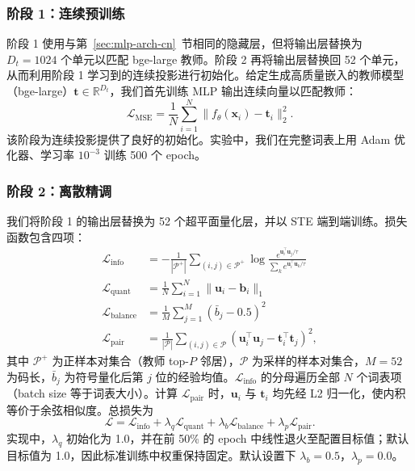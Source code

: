 \documentclass[11pt,a4paper]{article}
\begin{document}
\subsubsection{阶段 1：连续预训练}\label{sec:stage1-cn}

阶段 1 使用与第~\ref{sec:mlp-arch-cn}~节相同的隐藏层，但将输出层替换为 $D_t=1024$ 个单元以匹配 bge-large 教师。阶段 2 再将输出层替换回 52 个单元，从而利用阶段 1 学习到的连续投影进行初始化。给定生成高质量嵌入的教师模型（bge-large）$\mathbf{t} \in \mathbb{R}^{D_t}$，我们首先训练 MLP 输出连续向量以匹配教师：
\begin{equation}
    \mathcal{L}_{\text{MSE}} = \frac{1}{N} \sum_{i=1}^{N} \| f_\theta(\mathbf{x}_i) - \mathbf{t}_i \|_2^2.
\end{equation}
该阶段为连续投影提供了良好的初始化。实验中，我们在完整词表上用 Adam 优化器、学习率 $10^{-3}$ 训练 500 个 epoch。

\subsubsection{阶段 2：离散精调}\label{sec:stage2-cn}

我们将阶段 1 的输出层替换为 52 个超平面量化层，并以 STE 端到端训练。损失函数包含四项：
\begin{align}
    \mathcal{L}_{\text{info}} &= -\frac{1}{|\mathcal{P}^+|}\sum_{(i,j) \in \mathcal{P}^+} \log \frac{e^{\mathbf{u}_i^\top \mathbf{u}_j / \tau}}{\sum_{k} e^{\mathbf{u}_i^\top \mathbf{u}_k / \tau}} \\
    \mathcal{L}_{\text{quant}} &= \frac{1}{N} \sum_{i=1}^{N} \| \mathbf{u}_i - \mathbf{b}_i \|_1 \\
    \mathcal{L}_{\text{balance}} &= \frac{1}{M} \sum_{j=1}^{M} \left( \bar{b}_j - 0.5 \right)^2 \\
    \mathcal{L}_{\text{pair}} &= \frac{1}{|\mathcal{P}|} \sum_{(i,j) \in \mathcal{P}} \left( \mathbf{u}_i^\top \mathbf{u}_j - \mathbf{t}_i^\top \mathbf{t}_j \right)^2,
\end{align}
其中 $\mathcal{P}^+$ 为正样本对集合（教师 top-$P$ 邻居），$\mathcal{P}$ 为采样的样本对集合，$M=52$ 为码长，$\bar{b}_j$ 为符号量化后第 $j$ 位的经验均值。$\mathcal{L}_{\text{info}}$ 的分母遍历全部 $N$ 个词表项（batch size 等于词表大小）。计算 $\mathcal{L}_{\text{pair}}$ 时，$\mathbf{u}_i$ 与 $\mathbf{t}_i$ 均先经 L2 归一化，使内积等价于余弦相似度。总损失为
\begin{equation}
    \mathcal{L} = \mathcal{L}_{\text{info}} + \lambda_q \mathcal{L}_{\text{quant}} + \lambda_b \mathcal{L}_{\text{balance}} + \lambda_p \mathcal{L}_{\text{pair}}.
\end{equation}
实现中，$\lambda_q$ 初始化为 1.0，并在前 50\% 的 epoch 中线性退火至配置目标值；默认目标值为 1.0，因此标准训练中权重保持固定。默认设置下 $\lambda_b=0.5$，$\lambda_p=0.0$。
\end{document}
